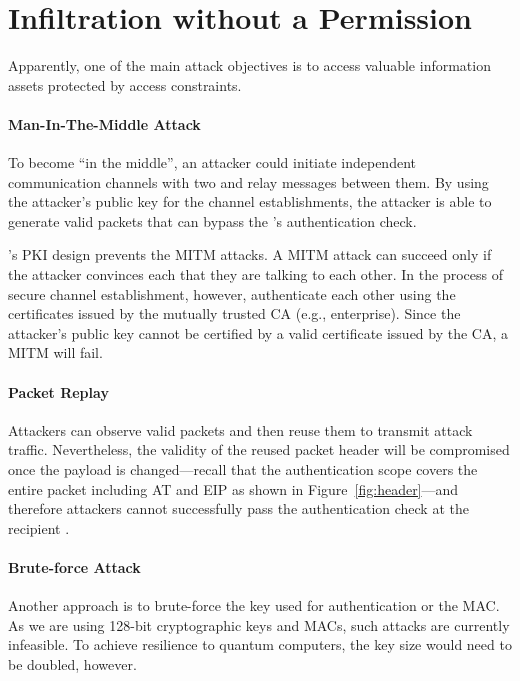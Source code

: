 \section{Infiltration without a Permission}
\label{sec:infiltration}

Apparently, one of the main attack objectives is to access valuable information assets 
protected by access constraints. 

\paragraph{Man-In-The-Middle Attack}
To become ``in the middle'', an attacker could initiate independent communication channels 
with two \tps and relay messages between them. By using the attacker's public key for the 
channel establishments, the attacker is able to generate valid packets that can bypass the
\tp's authentication check.  

\name's PKI design prevents the MITM attacks. A MITM attack
can succeed only if the attacker convinces each \tp that they are talking to each other.
In the process of secure channel establishment, however, \tps authenticate each other using 
the certificates issued by the mutually trusted CA (e.g., enterprise). Since the attacker's
public key cannot be certified by a valid certificate issued by the CA, a MITM will fail.


\paragraph{Packet Replay}
Attackers can observe valid \name packets and then reuse them to transmit attack traffic.
Nevertheless, the validity of the reused packet header will be compromised once the payload 
is changed---recall that the authentication scope covers the entire packet including 
AT and EIP as shown in Figure~\ref{fig:header}---and therefore attackers cannot 
successfully pass the authentication check at the recipient \tp.


\paragraph{Brute-force Attack}
Another approach is to brute-force the key used for authentication or the MAC. As we are using 128-bit cryptographic keys and MACs, such attacks are currently infeasible. To achieve resilience to quantum computers, the key size would need to be doubled, however.


